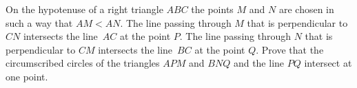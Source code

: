 \problem
On the hypotenuse of a right triangle $ABC$ the points $M$ and $N$ are chosen
in such a way that $AM < AN$.
The line passing through $M$ that is perpendicular to $CN$ intersects
the line~$AC$ at the point $P$.
The line passing through $N$ that is perpendicular to $CM$ intersects
the line~$BC$ at the point $Q$.
Prove that the circumscribed circles of the triangles $APM$ and $BNQ$ and
the line $PQ$ intersect at one point.
\solution
\endproblem
